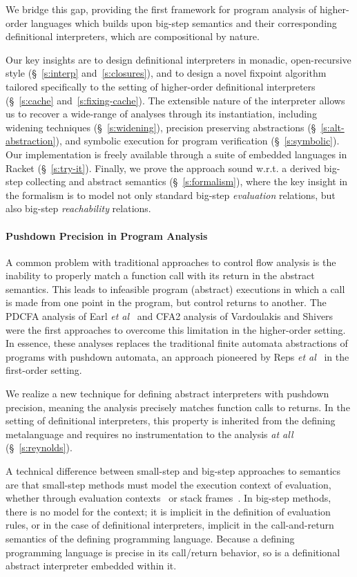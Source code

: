 We bridge this gap, providing the first framework for program analysis of
higher-order languages which builds upon big-step semantics and their
corresponding definitional interpreters, which are compositional by nature. 

Our key insights are to design definitional interpreters in monadic,
open-recursive style (§~\ref{s:interp} and~\ref{s:closures}), and to design a
novel fixpoint algorithm tailored specifically to the setting of higher-order
definitional interpreters (§~\ref{s:cache} and~\ref{s:fixing-cache}). The
extensible nature of the interpreter allows us to recover a wide-range of
analyses through its instantiation, including widening techniques
(§~\ref{s:widening}), precision preserving abstractions
(§~\ref{s:alt-abstraction}), and symbolic execution for program verification
(§~\ref{s:symbolic}). Our implementation is freely available through a suite of
embedded languages in Racket (§~\ref{s:try-it}). Finally, we prove the approach
sound w.r.t. a derived big-step collecting and abstract semantics
(§~\ref{s:formalism}), where the key insight in the formalism is to model not
only standard big-step \emph{evaluation} relations, but also big-step
\emph{reachability} relations.

\paragraph{Pushdown Precision in Program Analysis}
A common problem with traditional approaches to control flow analysis is the
inability to properly match a function call with its return in the abstract
semantics. This leads to infeasible program (abstract) executions in which a
call is made from one point in the program, but control returns to another.
The PDCFA analysis of Earl \emph{et al}~\cite{dvanhorn:Earl2010Pushdown} and
CFA2 analysis of Vardoulakis and Shivers~\cite{dvanhorn:Vardoulakis2011CFA2}
were the first approaches to overcome this limitation in the higher-order
setting. In essence, these analyses replaces the traditional finite automata
abstractions of programs with pushdown automata, an approach pioneered by Reps
\emph{et al}~\cite{dvanhorn:Reps1995Precise} in the first-order setting.

We realize a new technique for defining abstract interpreters with pushdown
precision, meaning the analysis precisely matches function calls to returns. In
the setting of definitional interpreters, this property is inherited from the
defining metalanguage and requires no instrumentation to the analysis \emph{at
all} (§~\ref{s:reynolds}).

A technical difference between small-step and big-step approaches to semantics
are that small-step methods must model the execution context of evaluation,
whether through evaluation contexts~\cite{local:felleisen-TCS1992} or stack
frames~\cite{dvanhorn:Felleisen1987Calculus}. In big-step methods, there is no
model for the context; it is implicit in the definition of evaluation rules, or
in the case of definitional interpreters, implicit in the call-and-return
semantics of the defining programming language. Because a defining programming
language is precise in its call/return behavior, so is a definitional abstract
interpreter embedded within it.
